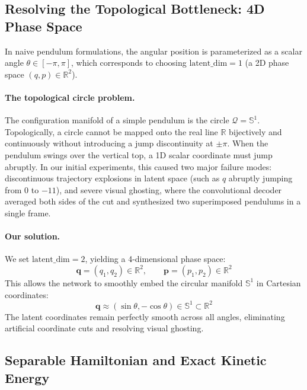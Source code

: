 \documentclass[11pt]{article}
\begin{document}
\subsection{Resolving the Topological Bottleneck: 4D Phase Space}
\label{subsec:topology}

In naive pendulum formulations, the angular position is parameterized as a scalar angle $\theta \in [-\pi, \pi]$, which corresponds to choosing $\text{latent\_dim} = 1$ (a 2D phase space $(q, p) \in \mathbb{R}^2$).

\paragraph{The topological circle problem.} 
The configuration manifold of a simple pendulum is the circle $\mathcal{Q} = \mathbb{S}^1$. Topologically, a circle cannot be mapped onto the real line $\mathbb{R}$ bijectively and continuously without introducing a jump discontinuity at $\pm\pi$. When the pendulum swings over the vertical top, a 1D scalar coordinate must jump abruptly. In our initial experiments, this caused two major failure modes: discontinuous trajectory explosions in latent space (such as $q$ abruptly jumping from $0$ to $-11$), and severe visual ghosting, where the convolutional decoder averaged both sides of the cut and synthesized two superimposed pendulums in a single frame.

\paragraph{Our solution.} 
We set $\text{latent\_dim} = 2$, yielding a 4-dimensional phase space:
\begin{equation}
    \mathbf{q} = (q_1, q_2) \in \mathbb{R}^2, \qquad \mathbf{p} = (p_1, p_2) \in \mathbb{R}^2
\end{equation}
This allows the network to smoothly embed the circular manifold $\mathbb{S}^1$ in Cartesian coordinates:
\begin{equation}
    \mathbf{q} \approx (\sin\theta, -\cos\theta) \in \mathbb{S}^1 \subset \mathbb{R}^2
\end{equation}
The latent coordinates remain perfectly smooth across all angles, eliminating artificial coordinate cuts and resolving visual ghosting.

\subsection{Separable Hamiltonian and Exact Kinetic Energy}
\label{subsec:separable_hnn}
\end{document}
